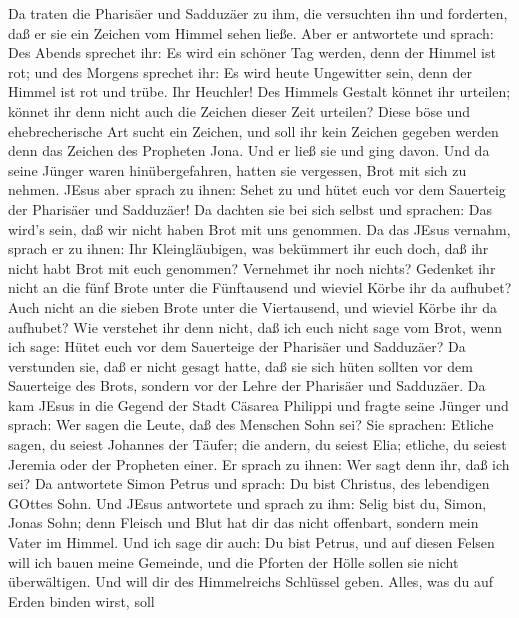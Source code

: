  Da traten die Pharisäer und Sadduzäer zu ihm, die
versuchten ihn und forderten, daß er sie ein Zeichen vom Himmel sehen
ließe.  Aber er antwortete und sprach: Des Abends sprechet
ihr: Es wird ein schöner Tag werden, denn der Himmel ist rot;
 und des Morgens sprechet ihr: Es wird heute Ungewitter
sein, denn der Himmel ist rot und trübe. Ihr Heuchler! Des Himmels
Gestalt könnet ihr urteilen; könnet ihr denn nicht auch die Zeichen
dieser Zeit urteilen?  Diese böse und ehebrecherische Art
sucht ein Zeichen, und soll ihr kein Zeichen gegeben werden denn das
Zeichen des Propheten Jona. Und er ließ sie und ging davon. 
Und da seine Jünger waren hinübergefahren, hatten sie vergessen, Brot
mit sich zu nehmen.  JEsus aber sprach zu ihnen: Sehet zu
und hütet euch vor dem Sauerteig der Pharisäer und Sadduzäer!
 Da dachten sie bei sich selbst und sprachen: Das wird's
sein, daß wir nicht haben Brot mit uns genommen.  Da das
JEsus vernahm, sprach er zu ihnen: Ihr Kleingläubigen, was bekümmert ihr
euch doch, daß ihr nicht habt Brot mit euch genommen? 
Vernehmet ihr noch nichts? Gedenket ihr nicht an die fünf Brote unter
die Fünftausend und wieviel Körbe ihr da aufhubet?  Auch
nicht an die sieben Brote unter die Viertausend, und wieviel Körbe ihr
da aufhubet?  Wie verstehet ihr denn nicht, daß ich euch
nicht sage vom Brot, wenn ich sage: Hütet euch vor dem Sauerteige der
Pharisäer und Sadduzäer?  Da verstunden sie, daß er nicht
gesagt hatte, daß sie sich hüten sollten vor dem Sauerteige des Brots,
sondern vor der Lehre der Pharisäer und Sadduzäer.  Da kam
JEsus in die Gegend der Stadt Cäsarea Philippi und fragte seine Jünger
und sprach: Wer sagen die Leute, daß des Menschen Sohn sei?
 Sie sprachen: Etliche sagen, du seiest Johannes der
Täufer; die andern, du seiest Elia; etliche, du seiest Jeremia oder der
Propheten einer.  Er sprach zu ihnen: Wer sagt denn ihr,
daß ich sei?  Da antwortete Simon Petrus und sprach: Du
bist Christus, des lebendigen GOttes Sohn.  Und JEsus
antwortete und sprach zu ihm: Selig bist du, Simon, Jonas Sohn; denn
Fleisch und Blut hat dir das nicht offenbart, sondern mein Vater im
Himmel.  Und ich sage dir auch: Du bist Petrus, und auf
diesen Felsen will ich bauen meine Gemeinde, und die Pforten der Hölle
sollen sie nicht überwältigen.  Und will dir des
Himmelreichs Schlüssel geben. Alles, was du auf Erden binden wirst, soll
